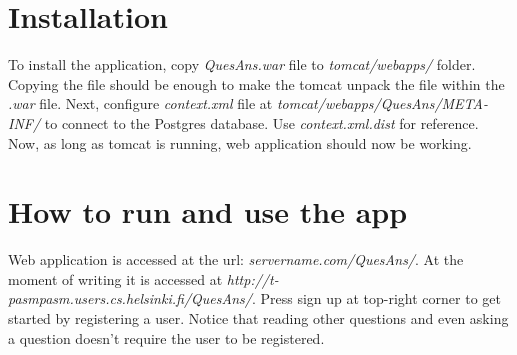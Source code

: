 \documentclass[a4paper,12pt]{article}
\begin{document}
\section{Installation}
To install the application, copy \emph{QuesAns.war} file to \emph{tomcat/webapps/} folder. Copying the file should be enough to make the tomcat unpack the file within the \emph{.war} file. \newline Next, configure \emph{context.xml} file at \emph{tomcat/webapps/QuesAns/META-INF/} to connect to the Postgres database. Use \emph{context.xml.dist} for reference. \newline
Now, as long as tomcat is running, web application should now be working.

\section{How to run and use the app}
Web application is accessed at the url: \emph{servername.com/QuesAns/}. At the moment of writing it is accessed at \emph{http://t-pasmpasm.users.cs.helsinki.fi/QuesAns/}. Press sign up at top-right corner to get started by registering a user. Notice that reading other questions and even asking a question doesn't require the user to be registered.
\end{document}
